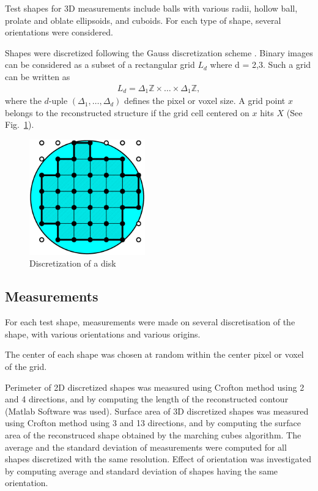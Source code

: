 \documentclass{InsightArticle}
\begin{document}
Test shapes for 3D measurements include
balls with various radii, hollow ball, prolate and oblate ellipsoids, and cuboids. 
For each type of shape, several orientations were considered.

Shapes were discretized following the Gauss discretization scheme \cite{Klette2004, Legland2007}.
Binary images can be considered as a subset of a rectangular grid $L_d$ where
d = 2,3. Such a grid can be written as
\begin{eqnarray}
L_d = \Delta_{1} \mathbb{Z} \times \ldots \times \Delta_{1} \mathbb{Z},
\end{eqnarray}
where the $d$-uple $(\Delta_{1},\ldots,\Delta_{d})$ defines the pixel
or voxel size. 
A grid point $x$ belongs to the reconstructed structure if the grid
cell centered on $x$ hits $X$ (See Fig.~\ref{fig:DiskDiscretization}).

\begin{figure}[!htb]
\begin{center}
\includegraphics[width=5cm]{images/discreteDisk}
\end{center}
\caption{Discretization of a disk}
\label{fig:DiskDiscretization}
\end{figure}


\subsection{Measurements}

For each test shape, measurements were made on
several discretisation of the shape, with various orientations and various origins.

The center of each shape was chosen at random within the center pixel or voxel of the grid.

Perimeter of 2D discretized shapes was measured using Crofton method using 2 and 4 directions, 
and by computing the length of the reconstructed contour (Matlab Software was used).
Surface area of 3D discretized shapes was measured using Crofton method using 3 and 13 directions, 
and by computing the surface area of the reconstruced shape obtained by the marching cubes algorithm.
The average and the standard deviation of measurements were computed for all shapes discretized
with the same resolution. Effect of orientation was investigated by computing average and standard 
deviation of shapes having the same orientation.
\end{document}
